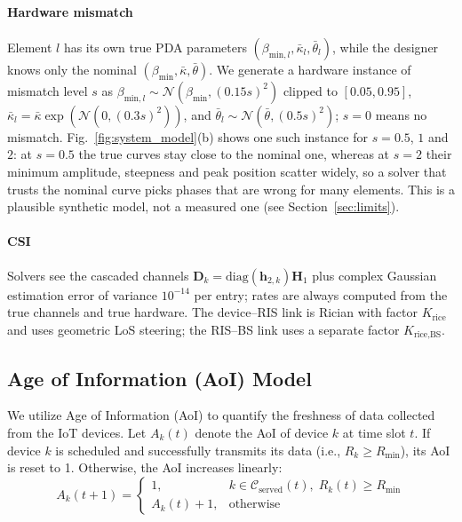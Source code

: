 \documentclass[journal]{IEEEtran}
\begin{document}
\paragraph*{Hardware mismatch} Element $l$ has its own true PDA parameters $(\beta_{\text{min},l}, \bar{\kappa}_l, \bar{\theta}_l)$, while the designer knows only the nominal $(\beta_{\text{min}}, \bar{\kappa}, \bar{\theta})$. We generate a hardware instance of mismatch level $s$ as $\beta_{\text{min},l}\sim\mathcal{N}(\beta_{\text{min}},(0.15s)^2)$ clipped to $[0.05,0.95]$, $\bar{\kappa}_l=\bar{\kappa}\exp(\mathcal{N}(0,(0.3s)^2))$, and $\bar{\theta}_l\sim\mathcal{N}(\bar{\theta},(0.5s)^2)$; $s=0$ means no mismatch. Fig.~\ref{fig:system_model}(b) shows one such instance for $s=0.5$, $1$ and $2$: at $s=0.5$ the true curves stay close to the nominal one, whereas at $s=2$ their minimum amplitude, steepness and peak position scatter widely, so a solver that trusts the nominal curve picks phases that are wrong for many elements. This is a plausible synthetic model, not a measured one (see Section~\ref{sec:limits}).


\paragraph*{CSI} Solvers see the cascaded channels $\mathbf{D}_k=\text{diag}(\mathbf{h}_{2,k})\mathbf{H}_1$ plus complex Gaussian estimation error of variance $10^{-14}$ per entry; rates are always computed from the true channels and true hardware. The device--RIS link is Rician with factor $K_{\text{rice}}$ and uses geometric LoS steering; the RIS--BS link uses a separate factor $K_{\text{rice,BS}}$.

\subsection{Age of Information (AoI) Model}
We utilize Age of Information (AoI) to quantify the freshness of data collected from the IoT devices. Let $A_k(t)$ denote the AoI of device $k$ at time slot $t$. If device $k$ is scheduled and successfully transmits its data (i.e., $R_k \geq R_{\text{min}}$), its AoI is reset to 1. Otherwise, the AoI increases linearly:
\begin{equation}
    A_k(t+1) = \begin{cases} 1, & k \in \mathcal{C}_{\text{served}}(t),\; R_k(t) \geq R_{\text{min}} \\ A_k(t) + 1, & \text{otherwise} \end{cases}
\end{equation}
\end{document}
